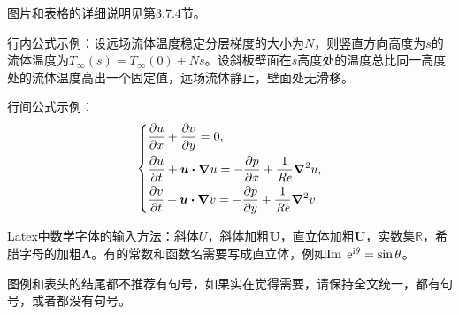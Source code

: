 图片和表格的详细说明见第3.7.4节。

行内公式示例：设远场流体温度稳定分层梯度的大小为$N$，则竖直方向高度为$s$的流体温度为$T_{\infty}(s)=T_{\infty}(0)+N s$。设斜板壁面在$s$高度处的温度总比同一高度处的流体温度高出一个固定值，远场流体静止，壁面处无滑移。

行间公式示例：
\begin{equation}
\label{eq:Boussinesq}
  \left\{
  \begin{aligned}
    & \frac{\partial u}{\partial x} + \frac{\partial v}{\partial y}=0, \\
    & \frac{\partial u}{\partial t} + \bm{u \cdot \nabla} u = - \frac{\partial p}{\partial x} + \frac{1}{\mbox{\textit{Re}}} \bm{\nabla}^2 u, \\
    & \frac{\partial v}{\partial t} + \bm{u \cdot \nabla} v = - \frac{\partial p}{\partial y} + \frac{1}{\mbox{\textit{Re}}} \bm{\nabla}^2 v.
  \end{aligned}
\right.
\end{equation}

Latex中数学字体的输入方法：斜体$U$，斜体加粗$\bm{U}$，直立体加粗$\mathbf{U}$，实数集$\mathbb{R}$，希腊字母的加粗$\bm{\Lambda}$。有的常数和函数名需要写成直立体，例如$\mathop{\rm Im}\; \mathrm{e}^{\mathrm{i}\theta} = \sin\theta$。

\bigskip
图例和表头的结尾都不推荐有句号，如果实在觉得需要，请保持全文统一，都有句号，或者都没有句号。

